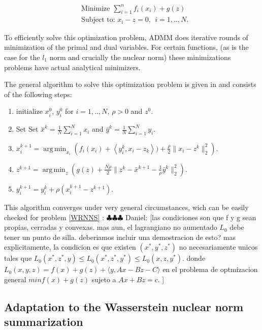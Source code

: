 \documentclass[12pt]{amsart}
\theoremstyle{remark}
\DeclareMathOperator*{\argmin}{arg\,min}
\newcommand{\ddr}[1]{{\color{blue} \sf $\clubsuit\clubsuit\clubsuit$ Daniel: [#1]}}
\begin{document}
\begin{equation}\label{GVC}
\begin{aligned}
& \text{Minimize   } \sum_{i=1}^n f_i(x_i)+g(z) \\
&\text{Subject to: } x_i-z = 0, \ \ i=1,..,N. 
\end{aligned}
\end{equation}



To efficiently solve this optimization problem, ADMM does iterative rounds of minimization of the primal and dual variables. For certain functions, (as is the case for the $l_1$ norm and crucially the nuclear norm) these minimizations problems have actual analytical minimizers. 


The general algorithm to solve this optimization problem is given in \cite{boyd2011distributed} and consists of the following steps:

\begin{enumerate}
\item initialize $x^0_i$, $y^0_i$ for $i=1,..,N$, $\rho>0$ and $z^0$.
\item Set $ \text{Set } \bar{x}^{k} = \frac{1}{N}\sum_{i=1}^N x_i $ and $\bar{y}^{k} = \frac{1}{N}\sum_{i=1}^N y_i $.
\item $x_i^{k+1} = \argmin_{x_i} \left( f_i(x_i) + \left \langle y_i^k,x_i-z_k \right \rangle) +\frac{\rho}{2}\|x_i-z^k\|_2^2\right ).$
\item $z^{k+1} = \argmin_z \left (g(z)+\frac{N\rho}{2}\|z^k-\bar{x}^{k+1} -\frac{1}{\rho}\bar{y}^k \|_2^2 \right ).$
\item $y_i^{k+1} = y_i^k + \rho(x_i^{k+1}-z^{k+1}).$
\end{enumerate}

This algorithm converges under very general circumstances, wich can be easily checked for problem \ref{WRNNS} :
\ddr{las condiciones son que f y g sean propias, cerradas y convexas. mas aun, el lagrangiano no aumentado $L_0$ debe tener un punto de silla. deberiamos incluir una demostracion de esto? mas explicitamente, la condicion es que 
existen $(x^*,y^*,z^*)$ no necesariamente unicos tales que $L_0(x^*,z^*,y)\leq L_0(x^*,z^*,y^*) \leq L_0(x,z,y^*).$ donde 
$L_0(x,y,z)= f(x)+g(z)+ \langle y, Ax-Bz-C\rangle $ en el problema de optmizacion general $min f(x)+g(z)$ sujeto a $Ax+Bz = c$.
}



\subsection{Adaptation to the Wasserstein nuclear norm summarization}
\end{document}
